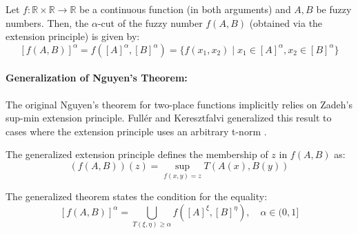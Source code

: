 \begin{theorem}
    Let $f: \mathbb{R} \times \mathbb{R} \to \mathbb{R}$ be a continuous function (in both arguments) and $A, B$ be fuzzy numbers. Then, the $\alpha$-cut of the fuzzy number $f(A,B)$ (obtained via the extension principle) is given by:
    \[
    [f(A,B)]^{\alpha} = f([A]^{\alpha}, [B]^{\alpha}) = \{f(x_1, x_2) \mid x_1 \in [A]^\alpha, x_2 \in [B]^\alpha\}
    \]
\end{theorem}

\paragraph{Generalization of Nguyen's Theorem:}
The original Nguyen's theorem for two-place functions implicitly relies on Zadeh's sup-min extension principle. Fullér and Keresztfalvi generalized this result to cases where the extension principle uses an arbitrary t-norm \cite[Sec. 1.9]{FULLER2}.

The generalized extension principle defines the membership of $z$ in $f(A,B)$ as:
\[
(f(A,B))(z) = \sup_{f(x,y)=z} T(A(x), B(y))
\]

The generalized theorem states the condition for the equality:
\begin{equation} \label{eq:nguyen_generalized}
[f(A, B)]^\alpha = \bigcup_{T(\xi, \eta) \ge \alpha} f([A]^\xi, [B]^\eta), \quad \alpha \in (0, 1]
\end{equation}


